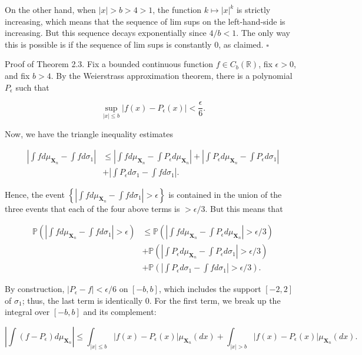 \documentclass[10pt]{article}
\begin{document}
On the other hand, when $|x|>b>4>1$, the function $k \mapsto|x|^{k}$ is strictly increasing, which means that the sequence of lim sups on the left-hand-side is increasing. But this sequence decays exponentially since $4 / b<1$. The only way this is possible is if the sequence of lim sups is constantly 0, as claimed. \(\square\)

Proof of Theorem 2.3. Fix a bounded continuous function $f \in C_{b}(\mathbb{R})$, fix $\epsilon>0$, and fix $b>4$. By the Weierstrass approximation theorem, there is a polynomial $P_{\epsilon}$ such that

$$
\sup _{|x| \leq b}\left|f(x)-P_{\epsilon}(x)\right|<\frac{\epsilon}{6} .
$$

Now, we have the triangle inequality estimates

$$
\begin{aligned}
\left|\int f d \mu_{\mathbf{X}_{n}}-\int f d \sigma_{1}\right| & \leq\left|\int f d \mu_{\mathbf{X}_{n}}-\int P_{\epsilon} d \mu_{\mathbf{X}_{n}}\right|+\left|\int P_{\epsilon} d \mu_{\mathbf{X}_{n}}-\int P_{\epsilon} d \sigma_{1}\right| \\
& +\left|\int P_{\epsilon} d \sigma_{1}-\int f d \sigma_{1}\right| .
\end{aligned}
$$

Hence, the event $\left\{\left|\int f d \mu_{\mathbf{X}_{n}}-\int f d \sigma_{1}\right|>\epsilon\right\}$ is contained in the union of the three events that each of the four above terms is $>\epsilon / 3$. But this means that

$$
\begin{aligned}
\mathbb{P}\left(\left|\int f d \mu_{\mathbf{X}_{n}}-\int f d \sigma_{1}\right|>\epsilon\right) & \leq \mathbb{P}\left(\left|\int f d \mu_{\mathbf{X}_{n}}-\int P_{\epsilon} d \mu_{\mathbf{X}_{n}}\right|>\epsilon / 3\right) \\
& +\mathbb{P}\left(\left|\int P_{\epsilon} d \mu_{\mathbf{X}_{n}}-\int P_{\epsilon} d \sigma_{1}\right|>\epsilon / 3\right) \\
& +\mathbb{P}\left(\left|\int P_{\epsilon} d \sigma_{1}-\int f d \sigma_{1}\right|>\epsilon / 3\right) .
\end{aligned}
$$

By construction, $\left|P_{\epsilon}-f\right|<\epsilon / 6$ on $[-b, b]$, which includes the support $[-2,2]$ of $\sigma_{1}$; thus, the last term is identically 0. For the first term, we break up the integral over $[-b, b]$ and its complement:

$$
\left|\int\left(f-P_{\epsilon}\right) d \mu_{\mathbf{X}_{n}}\right| \leq \int_{|x| \leq b}\left|f(x)-P_{\epsilon}(x)\right| \mu_{\mathbf{X}_{n}}(d x)+\int_{|x|>b}\left|f(x)-P_{\epsilon}(x)\right| \mu_{\mathbf{X}_{n}}(d x) .
$$
\end{document}
